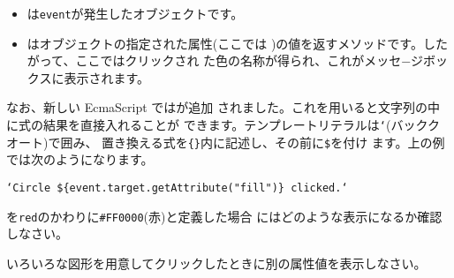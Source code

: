 \begin{itemize}
			 
 \item {}は\texttt{event}が発生したオブジェクトです。
 \item {}はオブジェクトの指定された属性(ここでは
 )の値を返すメソッドです。したがって、ここではクリックされ
 た色の名称が得られ、これがメッセ−ジボックスに表示されます。
\end{itemize}

			 なお、新しい EcmaScript ではが追加
			 されました。これを用いると文字列の中に式の結果を直接入れることが
			 できます。テンプレートリテラルは\texttt{`}(バッククオート)で囲み、
			 置き換える式を\texttt{\{\}}内に記述し、その前に\texttt{\$}を付け
			 ます。上の例では次のようになります。

			 \texttt{`Circle \$\{event.target.getAttribute("fill")\} clicked.`}

\begin{Problem}\upshape
 を\texttt{\upshape red}のかわりに\verb+#FF0000+(赤)と定義した場合
 にはどのような表示になるか確認しなさい。
\end{Problem}
\begin{Problem}
 いろいろな図形を用意してクリックしたときに別の属性値を表示しなさい。
\end{Problem}

